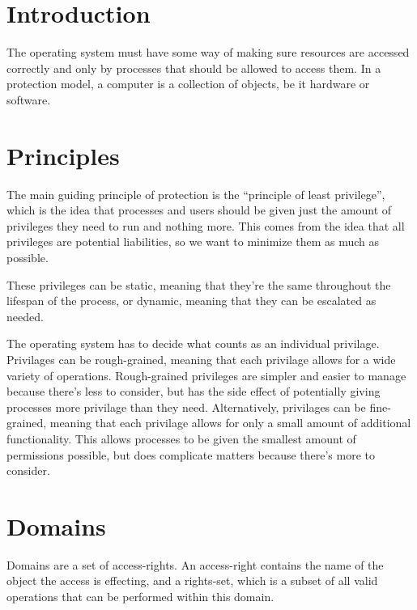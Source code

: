\documentclass{article}
\begin{document}
\maketitle
\tableofcontents

\section{Introduction}

The operating system must have some way of making sure resources are accessed
correctly and only by processes that should be allowed to access them. In a
protection model, a computer is a collection of objects, be it hardware or
software.

\section{Principles}

The main guiding principle of protection is the ``principle of least
privilege'', which is the idea that processes and users should be given just the
amount of privileges they need to run and nothing more. This comes from the idea
that all privileges are potential liabilities, so we want to minimize them as
much as possible.

These privileges can be static, meaning that they're the same throughout the
lifespan of the process, or dynamic, meaning that they can be escalated as
needed.

The operating system has to decide what counts as an individual privilage.
Privilages can be rough-grained, meaning that each privilage allows for a wide
variety of operations. Rough-grained privileges are simpler and easier to manage
because there's less to consider, but has the side effect of potentially giving
processes more privilage than they need. Alternatively, privilages can be
fine-grained, meaning that each privilage allows for only a small amount of
additional functionality. This allows processes to be given the smallest amount
of permissions possible, but does complicate matters because there's more to
consider.

\section{Domains}

Domains are a set of access-rights. An access-right contains the name of the
object the access is effecting, and a rights-set, which is a subset of all valid
operations that can be performed within this domain.
\end{document}
